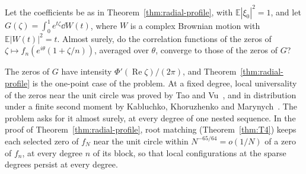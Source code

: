 \begin{problem}\label{prob:local}
Let the coefficients be as in Theorem~\ref{thm:radial-profile}, with
$\mathbb E|\xi_0|^2=1$, and let $G(\zeta)=\int_0^1e^{t\zeta}\dd W(t)$,
where $W$ is a complex Brownian motion with $\mathbb E|W(t)|^2=t$.
Almost surely, do the correlation functions of the zeros of
$\zeta\mapsto f_n(e^{i\theta}(1+\zeta/n))$, averaged over $\theta$,
converge to those of the zeros of $G$?
\end{problem}

The zeros of $G$ have intensity $\Phi'(\operatorname{Re}\zeta)/(2\pi)$, and
Theorem~\ref{thm:radial-profile} is the one-point case of the problem.
At a fixed degree, local universality of the zeros near the unit circle
was proved by Tao and Vu~\cite{TaoVu2015}, and in distribution under a
finite second moment by Kabluchko, Khoruzhenko and
Marynych~\cite{KabluchkoKhoruzhenkoMarynych2025}. The problem asks for it
almost surely, at every degree of one nested sequence.
In the proof of Theorem~\ref{thm:radial-profile}, root matching
(Theorem~\ref{thm:T4}) keeps each selected zero of $f_N$ near the unit
circle within $N^{-65/64}=o(1/N)$ of a zero of $f_n$, at every degree $n$
of its block, so that local configurations at the sparse degrees persist
at every degree.
